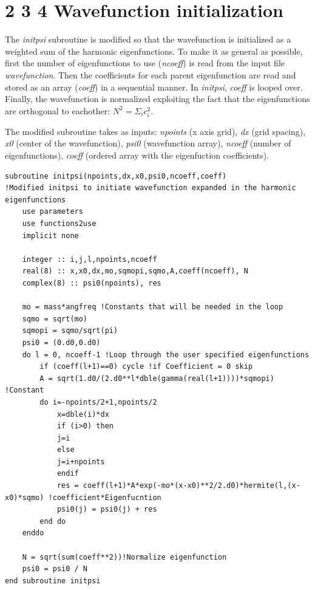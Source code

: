 \documentclass{cis320}
\begin{document}
\section*{2 3 4 \quad Wavefunction initialization}
\setcounter{section}{4}
The \textit{initpsi} subroutine is modified so that the wavefunction is initialized as a weighted sum of the harmonic eigenfunctions. To make it as general as possible, first the number of eigenfunctions to use (\textit{ncoeff}) is read from the input file \textit{wavefunction}. Then the coefficients for each parent eigenfunction are read and stored as an array (\textit{coeff}) in a sequential manner. In \textit{initpsi}, \textit{coeff} is looped over.\\
Finally, the wavefunction is normalized exploiting the fact that the eigenfunctions are orthogonal to eachother: $N^2 = \Sigma_i c_i^2$.\\
\par
The modified subroutine takes as inputs: \textit{npoints} (x axis grid), \textit{dx} (grid spacing), \textit{x0} (center of the wavefunction), \textit{psi0} (wavefunction array), \textit{ncoeff} (number of eigenfunctions), \textit{coeff} (ordered array with the eigenfuction coefficients).

    \begin{lstlisting}[caption=Modified \textit{initpsi} subroutine]
subroutine initpsi(npoints,dx,x0,psi0,ncoeff,coeff)      
!Modified initpsi to initiate wavefunction expanded in the harmonic eigenfunctions
    use parameters
    use functions2use
    implicit none
    
    integer :: i,j,l,npoints,ncoeff
    real(8) :: x,x0,dx,mo,sqmopi,sqmo,A,coeff(ncoeff), N
    complex(8) :: psi0(npoints), res
    
    mo = mass*angfreq !Constants that will be needed in the loop
    sqmo = sqrt(mo) 
    sqmopi = sqmo/sqrt(pi)
    psi0 = (0.d0,0.d0) 
    do l = 0, ncoeff-1 !Loop through the user specified eigenfunctions
        if (coeff(l+1)==0) cycle !if Coefficient = 0 skip
        A = sqrt(1.d0/(2.d0**l*dble(gamma(real(l+1))))*sqmopi) !Constant
        do i=-npoints/2+1,npoints/2
            x=dble(i)*dx
            if (i>0) then
            j=i
            else     
            j=i+npoints
            endif
            res = coeff(l+1)*A*exp(-mo*(x-x0)**2/2.d0)*hermite(l,(x-x0)*sqmo) !coefficient*Eigenfucntion
            psi0(j) = psi0(j) + res
        end do
    enddo
    
    N = sqrt(sum(coeff**2))!Normalize eigenfunction
    psi0 = psi0 / N 
end subroutine initpsi\end{lstlisting}
\end{document}
